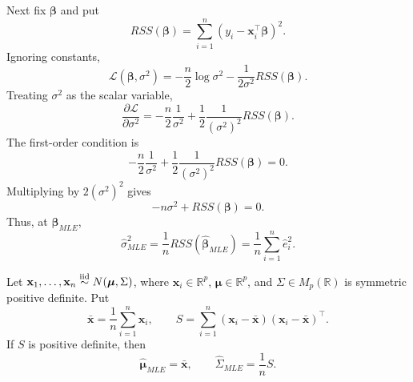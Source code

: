 \begin{pfbox}
Next fix $\boldsymbol{\beta}$ and put
\[
    RSS(\boldsymbol{\beta})=\sum_{i=1}^n(y_i-\mathbf{x}_i^{\top}\boldsymbol{\beta})^2.
\]
Ignoring constants,
\[
    \mathcal{L}(\boldsymbol{\beta},\sigma^2)
    =
    -\frac{n}{2}\log\sigma^2
    -
    \frac{1}{2\sigma^2}RSS(\boldsymbol{\beta}).
\]
Treating $\sigma^2$ as the scalar variable,
\[
    \frac{\partial \mathcal{L}}{\partial \sigma^2}
    =
    -\frac{n}{2}\frac{1}{\sigma^2}
    +
    \frac{1}{2}\frac{1}{(\sigma^2)^2}RSS(\boldsymbol{\beta}).
\]
The first-order condition is
\[
    -\frac{n}{2}\frac{1}{\sigma^2}
    +
    \frac{1}{2}\frac{1}{(\sigma^2)^2}RSS(\boldsymbol{\beta})
    =
    0.
\]
Multiplying by $2(\sigma^2)^2$ gives
\[
    -n\sigma^2+RSS(\boldsymbol{\beta})=0.
\]
Thus, at $\widehat{\boldsymbol{\beta}}_{MLE}$,
\[
    \widehat\sigma^2_{MLE}
    =
    \frac{1}{n}RSS(\widehat{\boldsymbol{\beta}}_{MLE})
    =
    \frac{1}{n}\sum_{i=1}^n\widehat e_i^2.
\]
\end{pfbox}



\begin{theorem}
Let $\mathbf{x}_1,\ldots,\mathbf{x}_n\overset{\text{iid}}{\sim} N(\boldsymbol{\mu},\Sigma)$, where
$\mathbf{x}_i\in\mathbb{R}^p$, $\boldsymbol{\mu}\in\mathbb{R}^p$, and
$\Sigma\in M_p(\mathbb{R})$ is symmetric positive definite. Put
\[
    \bar{\mathbf{x}}
    =
    \frac{1}{n}\sum_{i=1}^n\mathbf{x}_i,
    \qquad
    S
    =
    \sum_{i=1}^n
    (\mathbf{x}_i-\bar{\mathbf{x}})
    (\mathbf{x}_i-\bar{\mathbf{x}})^{\top}.
\]
If $S$ is positive definite, then
\[
    \widehat{\boldsymbol{\mu}}_{MLE}
    =
    \bar{\mathbf{x}},
    \qquad
    \widehat\Sigma_{MLE}
    =
    \frac{1}{n}S.
\]
\end{theorem}

